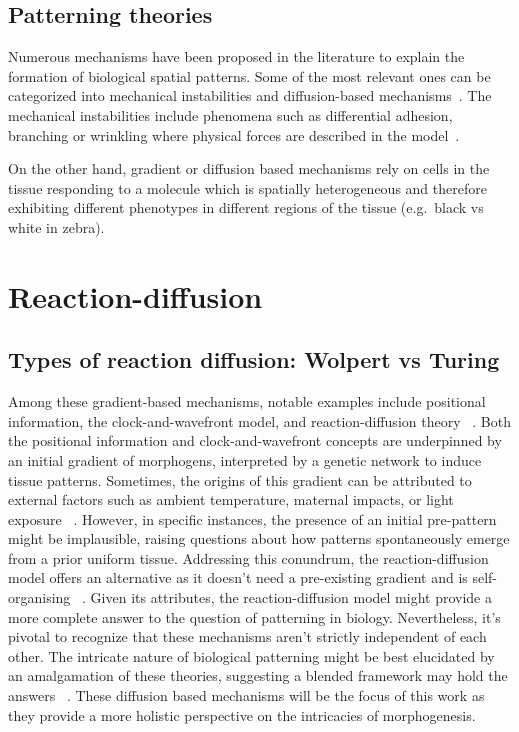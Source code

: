 \subsection{Patterning theories}
Numerous mechanisms have been proposed in the literature to explain the formation of biological spatial patterns.
Some of the most relevant ones can be categorized into mechanical instabilities and diffusion-based mechanisms~\parencite{kosmrlj2020_2}.
The mechanical instabilities include phenomena such as differential adhesion, branching or wrinkling where physical forces are described in the model~\parencite{Scholes2017}.

On the other hand, gradient or diffusion based mechanisms rely on cells in the tissue responding to a molecule which is spatially heterogeneous and therefore exhibiting different phenotypes in different regions of the tissue (e.g.\ black vs white in zebra).


\section{Reaction-diffusion}
\subsection{Types of reaction diffusion: Wolpert vs Turing}
Among these gradient-based mechanisms, notable examples include positional information, the clock-and-wavefront model, and reaction-diffusion theory ~\parencite{Wolpert1969, Baker2006, Turing1952}.
Both the positional information and clock-and-wavefront concepts are underpinned by an initial gradient of morphogens, interpreted by a genetic network to induce tissue patterns.
Sometimes, the origins of this gradient can be attributed to external factors such as ambient temperature, maternal impacts, or light exposure ~\parencite{Schier2009}.
However, in specific instances, the presence of an initial pre-pattern might be implausible, raising questions about how patterns spontaneously emerge from a prior uniform tissue.
Addressing this conundrum, the reaction-diffusion model offers an alternative as it doesn't need a pre-existing gradient and is self-organising ~\parencite{Kondo2010a}.
Given its attributes, the reaction-diffusion model might provide a more complete answer to the question of patterning in biology.
Nevertheless, it's pivotal to recognize that these mechanisms aren't strictly independent of each other.
The intricate nature of biological patterning might be best elucidated by an amalgamation of these theories, suggesting a blended framework may hold the answers ~\parencite{Green2015}. %
These diffusion based mechanisms will be the focus of this work as they provide a more holistic perspective on the intricacies of morphogenesis.
